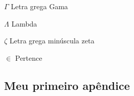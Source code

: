 \documentclass[
	10pt,				%
	openright,			%
	twoside,			%
	a4paper,			%
	chapter=TITLE,		%
	english,			%
	brazil				%
	]{abntex2}
\begin{document}

\cleardoublepage

\begin{simbolos}
  \item[$ \Gamma $] Letra grega Gama
  \item[$ \Lambda $] Lambda
  \item[$ \zeta $] Letra grega minúscula zeta
  \item[$ \in $] Pertence
\end{simbolos}




\tableofcontents*
\cleardoublepage


\textual













\postextual




\begin{apendicesenv}
\partapendices

\chapter{Meu primeiro apêndice}
\lipsum[50]

\end{apendicesenv}
\end{document}

